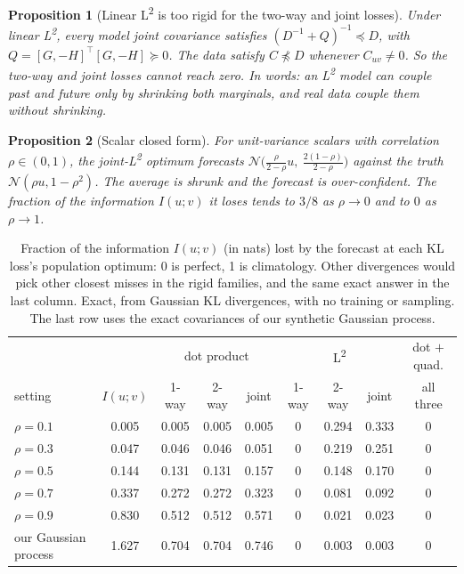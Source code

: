 \documentclass[11pt]{article}
\newcommand{\Ltwo}{L\textsuperscript{2}}
\theoremstyle{plain}
\newtheorem{proposition}{Proposition}
\theoremstyle{definition}
\theoremstyle{remark}
\begin{document}
\begin{proposition}[Linear \Ltwo{} is too rigid for the two-way and joint losses]\label{prop:l2joint}
Under linear \Ltwo{}, every model joint covariance satisfies $(D^{-1}+Q)^{-1}\preceq D$, with
$Q=[G,-H]^\top[G,-H]\succeq0$. The data satisfy $C\not\preceq D$ whenever $C_{uv}\neq0$. So the two-way
and joint losses cannot reach zero. In words: an \Ltwo{} model can couple past and future
only by shrinking both marginals, and real data couple them without shrinking.
\end{proposition}

\begin{proposition}[Scalar closed form]\label{prop:scalar}
For unit-variance scalars with correlation $\rho\in(0,1)$, the joint-\Ltwo{} optimum forecasts
$\mathcal N\big(\tfrac{\rho}{2-\rho}u,\ \tfrac{2(1-\rho)}{2-\rho}\big)$ against the truth
$\mathcal N(\rho u, 1-\rho^2)$. The average is shrunk and the forecast is over-confident. The
fraction of the information $I(u;v)$ it loses tends to $3/8$ as $\rho\to0$ and to $0$ as
$\rho\to1$.
\end{proposition}

\begin{table}[h]
\centering\small
\begin{tabular}{@{}lc|ccc|ccc|c@{}}
\toprule
& & \multicolumn{3}{c|}{dot product} & \multicolumn{3}{c|}{\Ltwo{}} & dot $+$ quad. \\
setting & $I(u;v)$ & 1-way & 2-way & joint & 1-way & 2-way & joint & all three \\
\midrule
$\rho=0.1$ & 0.005 & 0.005 & 0.005 & 0.005 & 0 & 0.294 & 0.333 & 0 \\
$\rho=0.3$ & 0.047 & 0.046 & 0.046 & 0.051 & 0 & 0.219 & 0.251 & 0 \\
$\rho=0.5$ & 0.144 & 0.131 & 0.131 & 0.157 & 0 & 0.148 & 0.170 & 0 \\
$\rho=0.7$ & 0.337 & 0.272 & 0.272 & 0.323 & 0 & 0.081 & 0.092 & 0 \\
$\rho=0.9$ & 0.830 & 0.512 & 0.512 & 0.571 & 0 & 0.021 & 0.023 & 0 \\
our Gaussian process & 1.627 & 0.704 & 0.704 & 0.746 & 0 & 0.003 & 0.003 & 0 \\
\bottomrule
\end{tabular}
\caption{Fraction of the information $I(u;v)$ (in nats) lost by the forecast at each KL loss's
population optimum: 0 is perfect, 1 is climatology. Other divergences would pick other
closest misses in the rigid families, and the same exact answer in the last column. Exact, from Gaussian KL divergences, with
no training or sampling. The last row uses the exact covariances of our synthetic Gaussian
process.}
\label{tab:miss}
\end{table}
\end{document}
